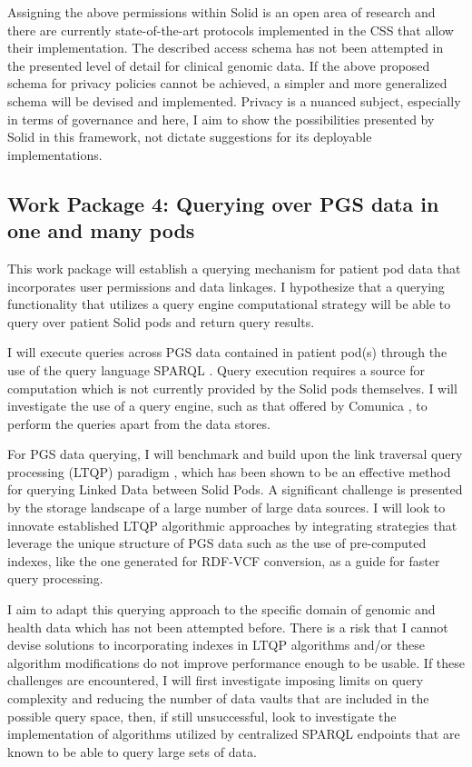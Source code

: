 \documentclass[runningheads]{llncs}
\begin{document}
Assigning the above permissions within Solid is an open area of research and there are currently state-of-the-art protocols implemented in the CSS that allow their implementation.
The described access schema has not been attempted in the presented level of detail for clinical genomic data.
If the above proposed schema for privacy policies cannot be achieved, a simpler and more generalized schema will be devised and implemented.
Privacy is a nuanced subject, especially in terms of governance and here, I aim to show the possibilities presented by Solid in this framework, not dictate suggestions for its deployable implementations. 

\subsection{Work Package 4: Querying over PGS data in one and many pods}

This work package will establish a querying mechanism for patient pod data that incorporates user permissions and data linkages. 
I hypothesize that a querying functionality that utilizes a query engine computational strategy will be able to query over patient Solid pods and return query results.

I will execute queries across PGS data contained in patient pod(s) through the use of the query language SPARQL \cite{noauthor_sparql_nodate}.
Query execution requires a source for computation which is not currently provided by the Solid pods themselves.
I will investigate the use of a query engine, such as that offered by Comunica \cite{comunica}, to perform the queries apart from the data stores.

For PGS data querying, I will benchmark and build upon the link traversal query processing (LTQP) paradigm \cite{taelman_evaluation_2023}, which has been shown to be an effective method for querying Linked Data between Solid Pods. 
A significant challenge is presented by the storage landscape of a large number of large data sources.
I will look to innovate established LTQP algorithmic approaches by integrating strategies that leverage the unique structure of PGS data such as the use of pre-computed indexes, like the one generated for RDF-VCF conversion, as a guide for faster query processing.

I aim to adapt this querying approach to the specific domain of genomic and health data which has not been attempted before. 
There is a risk that I cannot devise solutions to incorporating indexes in LTQP algorithms and/or these algorithm modifications do not improve performance enough to be usable.
If these challenges are encountered, I will first investigate imposing limits on query complexity and reducing the number of data vaults that are included in the possible query space, then, if still unsuccessful, look to investigate the implementation of algorithms utilized by centralized SPARQL endpoints that are known to be able to query large sets of data. 
\end{document}
